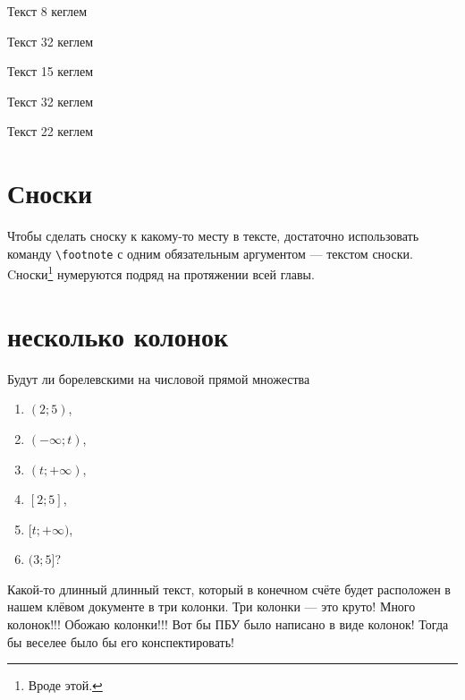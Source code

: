 \documentclass[12pt, a4paper]{article}
\begin{document}

{ \fontsize{8}{1.33}\selectfont Текст 8 кеглем}

{ \fontsize{32}{1.33}\selectfont Текст 32 кеглем}

{ \fontsize{15}{1.33}\selectfont Текст 15 кеглем}

\newcommand{\newsize}[1]
{{\fontsize{32}{1.33}\selectfont #1 }}

\newsize{ Текст 32 кеглем }

\newcommand{\mysize}[2]
{{\fontsize{#1}{1.33}\selectfont #2 }}

\mysize{22}{Текст 22 кеглем}


\section{Сноски}

Чтобы сделать сноску к какому-то месту в тексте, достаточно использовать команду \verb|\footnote| с одним обязательным аргументом — текстом сноски. Cноски\footnote{Вроде этой.} нумеруются подряд на протяжении всей главы.


\section{несколько колонок}

Будут ли борелевскими на числовой прямой множества
\begin{multicols}{2}
\begin{enumerate}
    \item $(2;5)$,
    \item $(-\infty;t)$,
    \item $(t; +\infty)$,
    \item $[2;5]$,
    \item $[t; +\infty)$,
    \item $(3;5]$?
\end{enumerate}
\end{multicols}

\begin{multicols}{3}
Какой-то длинный длинный текст, который в конечном счёте будет расположен  в нашем клёвом документе в три колонки. Три колонки --- это круто! Много колонок!!! Обожаю колонки!!! Вот бы ПБУ было написано в виде колонок! Тогда бы веселее было бы его конспектировать!
\end{multicols}
\end{document}
